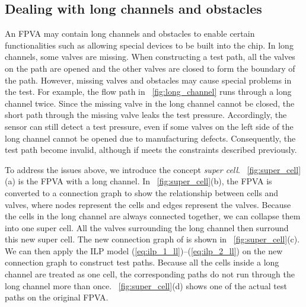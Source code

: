 \subsection{Dealing with long channels and obstacles}\label{sec:walls_holes}

An FPVA may contain long channels and obstacles to enable certain
functionalities such as allowing special devices to be built into the chip. 
In long channels, some valves are missing. 
When constructing a test path, all the valves on the path are opened
and the other valves are closed to form the boundary of the path. However,
missing valves and obstacles may cause special problems in the test.
For example, the flow path in \figname~\ref{fig:long_channel}  runs through
a long channel twice.  Since the missing valve in the long channel cannot be
closed, the short path through the missing valve leaks the test pressure.
Accordingly, the sensor can still detect a test pressure, even if some
valves 
on the left side of the long channel
cannot be opened due to manufacturing defects.
Consequently, the test path become invalid, although if meets the constraints
described previously.

%

To address the issues above, we introduce the concept \textit{super cell}.
\figname~\ref{fig:super_cell}(a) is the FPVA with a long channel. In
\figname~\ref{fig:super_cell}(b), the FPVA is converted to a connection graph
to show the relationship between cells and valves, where nodes represent the
cells and edges represent the valves. Because the cells in
the long channel are always connected together, we can collapse them into one
super cell. All the valves surrounding the long channel then surround this new
super cell. The new connection graph of is shown in
\figname~\ref{fig:super_cell}(c). We can then apply the ILP model
(\ref{eq:ilp_1_ll})--(\ref{eq:ilp_2_ll}) 
on the new connection graph to construct test paths.  Because all the cells
inside a long channel are treated as one cell, the corresponding paths do not run
through the long channel more than once. \figname~\ref{fig:super_cell}(d)
shows one of the actual test paths on the original FPVA. 

